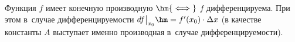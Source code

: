 
Функция $f$ имеет конечную производную $\hm{\iff}$ $f$ дифференцируема. При этом в~случае дифференцируемости
$df\big|_{x_0}\hm=f'(x_0)\cdot\Delta x$ (в качестве константы $A$ выступает именно производная в~случае дифференцируемости).
 